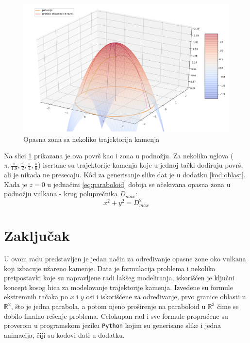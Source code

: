 \documentclass[a4paper]{article}
\begin{document}
\begin{figure}[h!]
\begin{center}
\includegraphics[width=\textwidth]{opasna_oblast.png}
\end{center}
\caption{Opasna zona sa nekoliko trajektorija kamenja}
\label{fig:paraboloid}
\end{figure}

Na slici \ref{fig:paraboloid} prikazana je ova površ kao i zona u podnožju.
Za nekoliko uglova ($\pi, \frac{\pi}{1.8}, \frac{\pi}{2}, \frac{\pi}{4}, 
\frac{\pi}{6} $) iscrtane su trajektorije kamenja koje u jednoj tački dodiruju
površ, ali je nikada ne presecaju. K\^{o}d za generisanje slike dat je u dodatku
\ref{kod:oblast}.\\

Kada je $z=0$ u jednačini \ref{eq:paraboloid} dobija se očekivana opasna zona 
u podnožju vulkana - krug poluprečnika
$D_{max}$:
\begin{equation}
x^2 + y^2 = D^2_{max}
\end{equation}


\section{Zaključak}
\label{sec:zakljucak}
U ovom radu predstavljen je jedan način za određivanje opasne zone oko vulkana koji
izbacuje užareno kamenje. Data je formulacija problema i nekoliko pretpostavki koje su 
napravljene radi lakšeg modeliranja, iskorišćen je ključni koncept kosog hica
za modelovanje trajektorije kamenja. Izvedene su formule ekstremnih tačaka 
po $x$ i $y$ osi i iskorišćene za određivanje, prvo granice oblasti u
$\mathbb{R}^2$, što je jedna parabola, a potom njeno proširenje na paraboloid u 
$\mathbb{R}^3$ čime se dobilo finalno rešenje problema. 
Celokupan rad i sve formule propraćene su proverom u programskom jeziku
\verb|Python| kojim su generisane slike i jedna animacija, čiji su kodovi
dati u dodatku.
\end{document}
